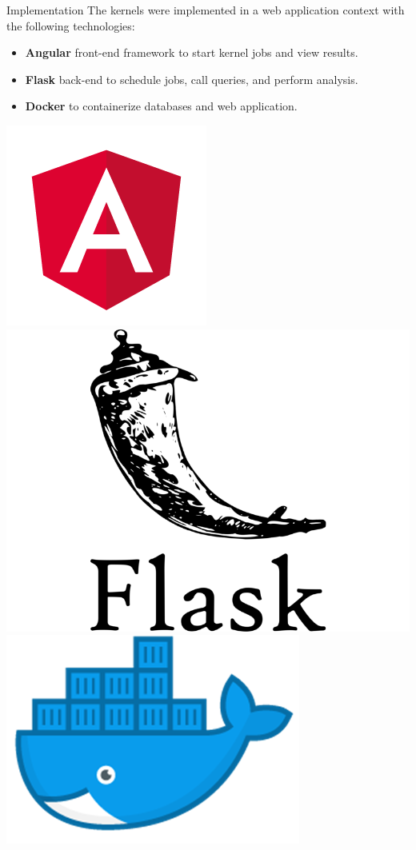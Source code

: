 %
\begin{frame}{Implementation}
    The kernels were implemented in a web application context with the following technologies:
    \vfill
    \begin{itemize}
        \item \textbf{Angular} front-end framework to start kernel jobs and view results.
        \item \textbf{Flask} back-end to schedule jobs, call queries, and perform analysis.
        \item \textbf{Docker} to containerize databases and web application.
    \end{itemize}
    \vfill
    \includegraphics[width=.25\textwidth]{img/webapp/angular-logo.png}
    \hfill
    \includegraphics[width=.25\textwidth]{img/webapp/flask-logo.png}
    \hfill
    \includegraphics[width=.25\textwidth]{img/webapp/docker-whale.png}
\end{frame}

